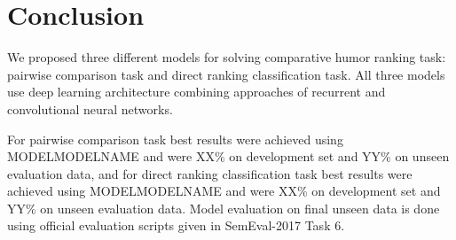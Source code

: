 \documentclass[10pt, a4paper]{article}
\begin{document}








\section{Conclusion}

We proposed three different models for solving comparative humor ranking task: pairwise comparison task and direct ranking classification task. All three models use deep learning architecture combining approaches of recurrent and convolutional neural networks.

For pairwise comparison task best results were achieved using MODELMODELNAME and were XX\% on development set and YY\% on unseen evaluation data, and for direct ranking classification task best results were achieved using MODELMODELNAME and were XX\% on development set and YY\% on unseen evaluation data. Model evaluation on final unseen data is done using official evaluation scripts given in SemEval-2017 Task 6.
\end{document}
